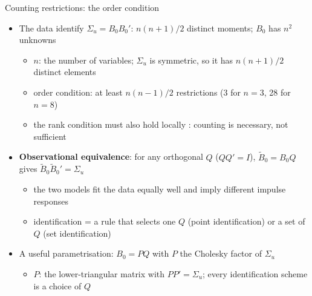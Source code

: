 \begin{frame}{Counting restrictions: the order condition}
\itemsize{\footnotesize}
\begin{itemize}
    \item The data identify $\Sigma_u = B_0B_0'$: $n(n + 1)/2$ distinct moments; $B_0$ has $n^2$ unknowns
    \begin{itemize}
        \item $n$: the number of variables; $\Sigma_u$ is symmetric, so it has $n(n + 1)/2$ distinct elements
        \item order condition: at least $n(n - 1)/2$ restrictions (3 for $n = 3$, 28 for $n = 8$)
        \item the rank condition must also hold locally : counting is necessary, not sufficient
    \end{itemize}
    \item \textbf{Observational equivalence}: for any orthogonal $Q$ ($QQ' = I$), $\tilde B_0 = B_0Q$ gives $\tilde B_0\tilde B_0' = \Sigma_u$
    \begin{itemize}
        \item the two models fit the data equally well and imply different impulse responses
        \item identification = a rule that selects one $Q$ (point identification) or a set of $Q$ (set identification)
    \end{itemize}
    \item A useful parametrisation: $B_0 = PQ$ with $P$ the Cholesky factor of $\Sigma_u$
    \begin{itemize}
        \item $P$: the lower-triangular matrix with $PP' = \Sigma_u$; every identification scheme is a choice of $Q$
    \end{itemize}
\end{itemize}
\end{frame}

